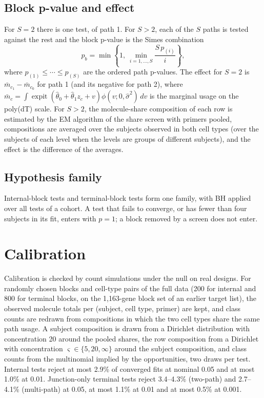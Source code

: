 \documentclass[11pt]{article}
\newcommand{\expit}{\operatorname{expit}}
\begin{document}
\subsection{Block p-value and effect}

For $S=2$ there is one test, of path 1. For $S>2$, each of the $S$ paths is tested against the rest and the block p-value is the Simes combination \[p_b=\min\left\{1,\ \min_{i=1,\ldots,S}\frac{S\,p_{(i)}}{i}\right\},\] where $p_{(1)}\le\cdots\le p_{(S)}$ are the ordered path p-values. The effect for $S=2$ is $\bar m_{c_1}-\bar m_{c_0}$ for path 1 (and its negative for path 2), where $\bar m_c=\int\expit(\widehat\theta_0+\widehat\theta_1z_c+v)\phi(v;0,\widehat\sigma^2)\,dv$ is the marginal usage on the poly(dT) scale. For $S>2$, the molecule-share composition of each row is estimated by the EM algorithm of the share screen with primers pooled, compositions are averaged over the subjects observed in both cell types (over the subjects of each level when the levels are groups of different subjects), and the effect is the difference of the averages.

\subsection{Hypothesis family}

Internal-block tests and terminal-block tests form one family, with BH applied over all tests of a cohort. A test that fails to converge, or has fewer than four subjects in its fit, enters with $p=1$; a block removed by a screen does not enter.

\section{Calibration}
\label{sec:calibration}

Calibration is checked by count simulations under the null on real designs. For randomly chosen blocks and cell-type pairs of the full data (200 for internal and 800 for terminal blocks, on the 1{,}163-gene block set of an earlier target list), the observed molecule totals per (subject, cell type, primer) are kept, and class counts are redrawn from compositions in which the two cell types share the same path usage. A subject composition is drawn from a Dirichlet distribution with concentration 20 around the pooled shares, the row composition from a Dirichlet with concentration $\varsigma\in\{5,20,\infty\}$ around the subject composition, and class counts from the multinomial implied by the opportunities, two draws per test. Internal tests reject at most 2.9\% of converged fits at nominal 0.05 and at most 1.0\% at 0.01. Junction-only terminal tests reject 3.4--4.3\% (two-path) and 2.7--4.1\% (multi-path) at 0.05, at most 1.1\% at 0.01 and at most 0.5\% at 0.001.
\end{document}

